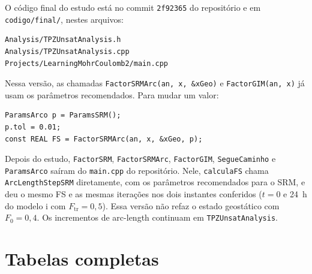 \documentclass[11pt,a4paper]{article}
\numberwithin{equation}{section}
\begin{document}
O código final do estudo está no commit \texttt{2f92365} do repositório e em \texttt{codigo/final/}, nestes arquivos:
\begin{verbatim}
Analysis/TPZUnsatAnalysis.h
Analysis/TPZUnsatAnalysis.cpp
Projects/LearningMohrCoulomb2/main.cpp
\end{verbatim}
Nessa versão, as chamadas \texttt{FactorSRMArc(an, x, \&xGeo)} e \texttt{FactorGIM(an, x)} já usam os parâmetros recomendados. Para mudar um valor:
\begin{verbatim}
ParamsArco p = ParamsSRM();
p.tol = 0.01;
const REAL FS = FactorSRMArc(an, x, &xGeo, p);
\end{verbatim}
Depois do estudo, \texttt{FactorSRM}, \texttt{FactorSRMArc}, \texttt{FactorGIM}, \texttt{SegueCaminho} e \texttt{ParamsArco} saíram do \texttt{main.cpp} do repositório. Nele, \texttt{calculaFS} chama \texttt{ArcLengthStepSRM} diretamente, com os parâmetros recomendados para o SRM, e deu o mesmo FS e as mesmas iterações nos dois instantes conferidos ($t = 0$ e 24~h do modelo i com $F_{\mathrm{tr}} = 0{,}5$). Essa versão não refaz o estado geostático com $F_0 = 0{,}4$. Os incrementos de arc-length continuam em \texttt{TPZUnsatAnalysis}.

\section{Tabelas completas}\label{ap:tabelas}
\end{document}
